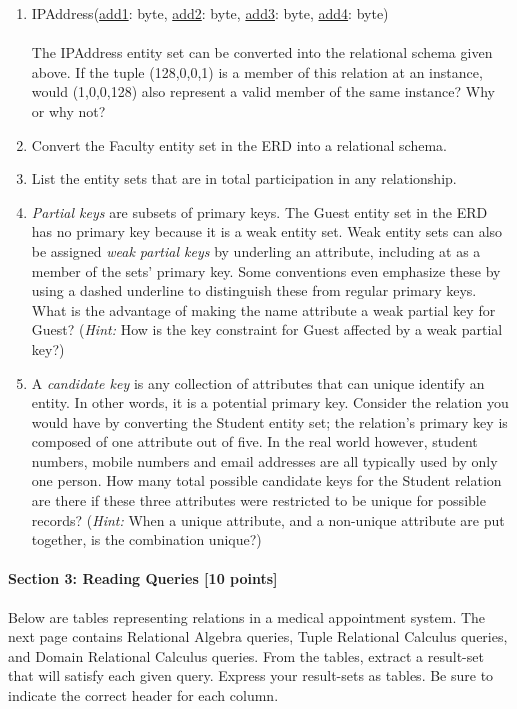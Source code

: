 \documentclass[a4paper,12pt,leqno]{article}
\begin{document}
\begin{enumerate}
\item 
IPAddress(\underline{add1}: byte, \underline{add2}: byte, \underline{add3}: byte, \underline{add4}: byte) \\\\
The IPAddress entity set can be converted into the relational schema given above. If the tuple (128,0,0,1) is a member of this relation at an instance, would (1,0,0,128) also represent a valid member of the same instance? Why or why not?

\item Convert the Faculty entity set in the ERD into a relational schema. 

\item List the entity sets that are in total participation in any relationship.

\item{\it Partial keys} are subsets of primary keys. The Guest entity set in the ERD has no primary key because it is a weak entity set. Weak entity sets can also be assigned {\it weak partial keys} by underling an attribute, including at as a member of the sets' primary key. Some conventions even emphasize these by using a dashed underline to distinguish these from regular primary keys. What is the advantage of making the name attribute a weak partial key for Guest? ({\it Hint: } How is the key constraint for Guest affected by a weak partial key?)

\item A {\it candidate key} is any collection of attributes that can unique identify an entity. In other words, it is a potential primary key. Consider the relation you would have by converting the Student entity set; the relation's primary key is composed of one attribute out of five. In the real world however, student numbers, mobile numbers and email addresses are all typically used by only one person. How many total possible candidate keys for the Student relation are there if these three attributes were restricted to be unique for possible records? ({\it Hint: } When a unique attribute, and a non-unique attribute are put together, is the combination unique?)

\end{enumerate}

\newpage
\paragraph{\textbf{Section 3: Reading Queries [10 points]}\\}
Below are tables representing relations in a medical appointment system. The next page contains Relational Algebra queries, Tuple Relational Calculus queries, and Domain Relational Calculus queries. From the tables, extract a result-set that will satisfy each given query. Express your result-sets as tables. Be sure to indicate the correct header for each column. \\
\end{document}

